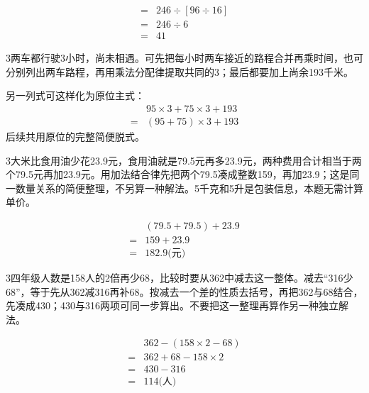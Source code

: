 \documentclass[multi=snippet,border={5bp 20bp 5bp 5bp}]{standalone}
\newenvironment{snippet}[3]{\begin{minipage}{#1bp}\color{answerred}\fontsize{#2}{#3}\selectfont\raggedright}{\end{minipage}}
\begin{document}
\begin{snippet}{216.067}{10.5}{12.8}\SourceSans\setlength{\mathindent}{2bp}\[\begin{aligned}={}&246\div[96\div16]\\={}&246\div6\\={}&41\end{aligned}\]\end{snippet}
\begin{snippet}{505}{11.5}{14}\begin{multicols}{3}\raggedcolumns 两车都行驶3小时，尚未相遇。可先把每小时两车接近的路程合并再乘时间，也可分别列出两车路程，再用乘法分配律提取共同的3；最后都要加上尚余193千米。\par 另一列式可这样化为原位主式：\[\begin{aligned}&95\times3+75\times3+193\\={}&(95+75)\times3+193\end{aligned}\]后续共用原位的完整简便脱式。\end{multicols}\end{snippet}
\begin{snippet}{505}{11.5}{14}\begin{multicols}{3}\raggedcolumns 大米比食用油少花23.9元，食用油就是79.5元再多23.9元，两种费用合计相当于两个79.5元再加23.9元。用加法结合律先把两个79.5凑成整数159，再加23.9；这是同一数量关系的简便整理，不另算一种解法。5千克和5升是包装信息，本题无需计算单价。\end{multicols}\end{snippet}
\begin{snippet}{189}{10.5}{12.8}\SourceSans\setlength{\mathindent}{2bp}\[\begin{aligned}&(79.5+79.5)+23.9\\={}&159+23.9\\={}&182.9\text{(元)}\end{aligned}\]\end{snippet}
\begin{snippet}{505}{11.5}{14}\begin{multicols}{3}\raggedcolumns 四年级人数是158人的2倍再少68，比较时要从362中减去这一整体。减去“316少68”，等于先从362减316再补68。按减去一个差的性质去括号，再把362与68结合，先凑成430；430与316两项可同一步算出。不要把这一整理再算作另一种独立解法。\end{multicols}\end{snippet}
\begin{snippet}{179}{10.5}{12.8}\SourceSans\setlength{\mathindent}{2bp}\[\begin{aligned}&362-(158\times2-68)\\={}&362+68-158\times2\\={}&430-316\\={}&114\text{(人)}\end{aligned}\]\end{snippet}
\end{document}
